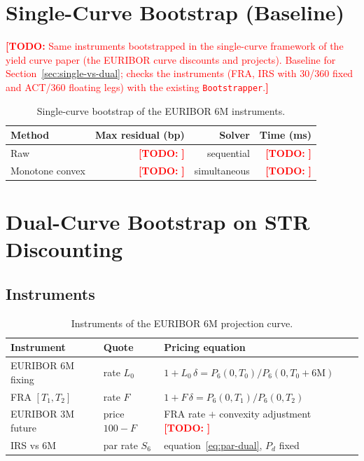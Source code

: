 \documentclass[11pt,a4paper]{article}
\theoremstyle{plain}
\theoremstyle{definition}
\newcommand{\todo}[1]{\textcolor{red}{\textbf{[TODO:} #1\textbf{]}}}
\begin{document}
\clearpage
\section{Single-Curve Bootstrap (Baseline)}
\label{sec:single}

\todo{Same instruments bootstrapped in the single-curve framework of the yield curve paper (the EURIBOR curve discounts and projects). Baseline for Section~\ref{sec:single-vs-dual}; checks the instruments (FRA, IRS with 30/360 fixed and ACT/360 floating legs) with the existing \texttt{Bootstrapper}.}

\begin{table}[htbp]
\centering
\small
\begin{tabular}{@{}lrrr@{}}
\toprule
Method & Max residual (bp) & Solver & Time (ms) \\
\midrule
Raw & \todo{} & sequential & \todo{} \\
Monotone convex & \todo{} & simultaneous & \todo{} \\
\bottomrule
\end{tabular}
\caption{Single-curve bootstrap of the EURIBOR 6M instruments.}
\label{tab:single}
\end{table}

\clearpage
\section{Dual-Curve Bootstrap on \texteuro STR Discounting}
\label{sec:dual}

\subsection{Instruments}
\begin{table}[htbp]
\centering
\begin{tabular}{@{}lll@{}}
\toprule
Instrument & Quote & Pricing equation \\
\midrule
EURIBOR 6M fixing & rate $L_0$ & $1+L_0\,\delta=P_6(0,T_0)/P_6(0,T_0+6\mathrm{M})$ \\
FRA $[T_1,T_2]$ & rate $F$ & $1+F\,\delta=P_6(0,T_1)/P_6(0,T_2)$ \\
EURIBOR 3M future & price $100-F$ & FRA rate $+$ convexity adjustment \todo{} \\
IRS vs 6M & par rate $S_6$ & equation~\eqref{eq:par-dual}, $P_d$ fixed \\
\bottomrule
\end{tabular}
\caption{Instruments of the EURIBOR 6M projection curve.}
\label{tab:instruments}
\end{table}
\end{document}
